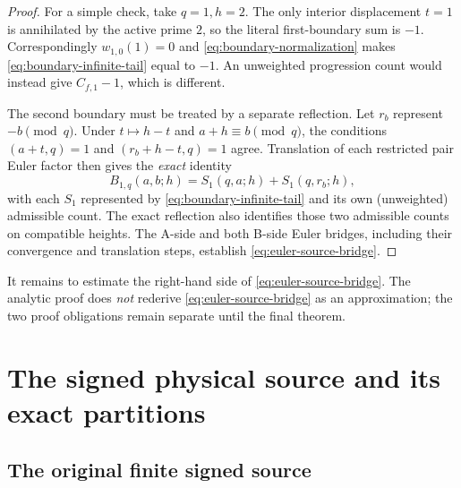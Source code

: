 \documentclass[11pt]{article}
\theoremstyle{definition}
\theoremstyle{remark}
\newcommand{\1}{\mathbf 1}
\begin{document}
\begin{proof}
For a simple check, take $q=1,h=2$. The only interior displacement
$t=1$ is annihilated by the active prime $2$, so the literal
first-boundary sum is $-1$. Correspondingly $w_{1,0}(1)=0$ and
\eqref{eq:boundary-normalization} makes
\eqref{eq:boundary-infinite-tail} equal to $-1$. An unweighted
progression count would instead give $C_{f,1}-1$, which is different.

The second boundary must be treated by a separate reflection. Let
$r_b$ represent $-b\pmod q$. Under $t\mapsto h-t$ and
$a+h\equiv b\pmod q$, the conditions
$(a+t,q)=1$ and $(r_b+h-t,q)=1$ agree. Translation of each
restricted pair Euler factor then gives the \emph{exact} identity
\begin{equation}\label{eq:two-boundary-weighted}
 \boxed{B_{1,q}(a,b;h)=S_1(q,a;h)+S_1(q,r_b;h),}
\end{equation}
with each $S_1$ represented by \eqref{eq:boundary-infinite-tail} and
its own (unweighted) admissible count. The exact reflection also
identifies those two admissible counts on compatible heights. The
A-side and both B-side Euler bridges, including their convergence
and translation steps, establish \eqref{eq:euler-source-bridge}.
\end{proof}

It remains to estimate the right-hand side of
\eqref{eq:euler-source-bridge}. The analytic proof does \emph{not}
rederive \eqref{eq:euler-source-bridge} as an approximation; the two
proof obligations remain separate until the final theorem.

\section{The signed physical source and its exact partitions}
\label{sec:signed-source}

\subsection{The original finite signed source}
\end{document}
